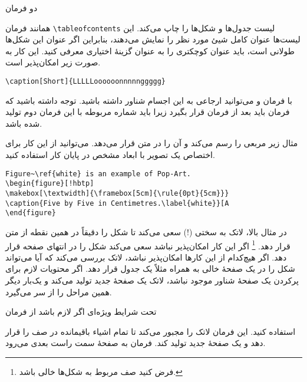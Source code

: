 دو فرمان

\begin{lscommand}
   
\end{lscommand}

\noindent 
همانند فرمان 
\verb|\tableofcontents| 
لیست جدول‌ها و شکل‌ها را چاپ می‌کند. این لیست‌ها عنوان کامل شییٔ مورد نظر را نمایش می‌دهند، بنابراین اگر عنوان این شکل‌ها طولانی است، باید عنوان کوچکتری را به عنوان گزینهٔ اختیاری معرفی کنید. این کار به صورت زیر امکان‌پذیر است.

\begin{code}
\verb|\caption[Short]{LLLLLoooooonnnnnggggg}| 
\end{code}

با فرمان 
 و 
 می‌توانید ارجاعی به این اجسام شناور داشته باشید. توجه داشته باشید که فرمان 
باید بعد از فرمان 
 قرار بگیرد زیرا باید شماره مربوطه با این فرمان دوم تولید شده باشد.

مثال زیر مربعی را رسم می‌کند و آن را در متن قرار می‌دهد. می‌توانید از این کار برای اختصاص یک تصویر با ابعاد مشخص در پایان کار استفاده کنید.

\begin{code}
\begin{verbatim}
Figure~\ref{white} is an example of Pop-Art.
\begin{figure}[!hbtp]
\makebox[\textwidth]{\framebox[5cm]{\rule{0pt}{5cm}}}
\caption{Five by Five in Centimetres.\label{white}}[A
\end{figure}
\end{verbatim}
\end{code}


\noindent 
در مثال بالا، لاتک به سختی (!) سعی می‌کند تا شکل را دقیقاً در همین نقطه از متن قرار دهد.%
\footnote{فرض کنید صف مربوط به شکل‌ها خالی باشد.}
اگر این کار امکان‌پذیر نباشد سعی می‌کند شکل را در انتهای صفحه قرار دهد. اگر هیچ‌کدام از این کارها امکان‌پذیر نباشد، لاتک بررسی می‌کند که آیا می‌تواند شکل را در یک صفحهٔ خالی به همراه مثلاً یک جدول قرار دهد. اگر محتویات لازم برای پرکردن یک صفحهٔ شناور موجود نباشد، لاتک یک صفحهٔ جدید تولید می‌کند و یک‌بار دیگر همین مراحل را از سر می‌گیرد.

تحت شرایط ویژه‌ای اگر لازم باشد از فرمان 

\begin{lscommand}
   
\end{lscommand}

\noindent 
استفاده کنید. این فرمان لاتک را مجبور می‌کند تا تمام اشیاء باقیمانده در صف را قرار دهد و یک صفحهٔ جدید تولید کند. فرمان
به صفحهٔ سمت راست بعدی می‌رود.

